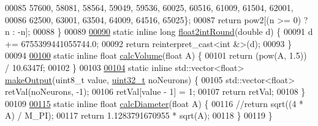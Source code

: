 \begin{DoxyCode}
00085       57600, 58081, 58564, 59049, 59536, 60025, 60516, 61009, 61504, 62001,
00086       62500, 63001, 63504, 64009, 64516, 65025\};
00087   \textcolor{keywordflow}{return} pow2[(n >= 0) ? n : -n];
00088 \}
00089 
\hypertarget{_common_operations_8h_source_l00090}{}\hyperlink{namespace_soil_math_a5b0b4bcf1fecd0f3eefc2520c624f9f4}{00090} \textcolor{keyword}{static} \textcolor{keyword}{inline} \textcolor{keywordtype}{long} \hyperlink{namespace_soil_math_a5b0b4bcf1fecd0f3eefc2520c624f9f4}{float2intRound}(\textcolor{keywordtype}{double} d) \{
00091   d += 6755399441055744.0;
00092   \textcolor{keywordflow}{return} \textcolor{keyword}{reinterpret\_cast<}\textcolor{keywordtype}{int} &\textcolor{keyword}{>}(d);
00093 \}
00094 
\hypertarget{_common_operations_8h_source_l00100}{}\hyperlink{namespace_soil_math_a9a50918db8a6d4eb2c1f720942b9d63c}{00100} \textcolor{keyword}{static} \textcolor{keyword}{inline} \textcolor{keywordtype}{float} \hyperlink{namespace_soil_math_a9a50918db8a6d4eb2c1f720942b9d63c}{calcVolume}(\textcolor{keywordtype}{float} A) \{
00101   \textcolor{keywordflow}{return} (pow(A, 1.5)) / 10.6347f;
00102 \}
00103 
\hypertarget{_common_operations_8h_source_l00104}{}\hyperlink{namespace_soil_math_a210cca0b7bfd4ca8af3590a7fc5fadb5}{00104} \textcolor{keyword}{static} \textcolor{keyword}{inline} std::vector<float> \hyperlink{namespace_soil_math_a210cca0b7bfd4ca8af3590a7fc5fadb5}{makeOutput}(uint8\_t value, \hyperlink{_soil_math_types_8h_a435d1572bf3f880d55459d9805097f62}{uint32\_t} noNeurons) \{
00105   std::vector<float> retVal(noNeurons, -1);
00106   retVal[value - 1] = 1;
00107   \textcolor{keywordflow}{return} retVal;
00108 \}
00109 
\hypertarget{_common_operations_8h_source_l00115}{}\hyperlink{namespace_soil_math_ae17c1f3bc0e6ed194ee3239cdd3a6486}{00115} \textcolor{keyword}{static} \textcolor{keyword}{inline} \textcolor{keywordtype}{float} \hyperlink{namespace_soil_math_ae17c1f3bc0e6ed194ee3239cdd3a6486}{calcDiameter}(\textcolor{keywordtype}{float} A) \{
00116   \textcolor{comment}{//return sqrt((4 * A) / M\_PI);}
00117   \textcolor{keywordflow}{return} 1.1283791670955 * sqrt(A);
00118 \}
00119 \}
\end{DoxyCode}
